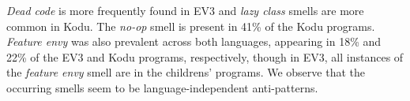 \documentclass[conference]{IEEEtran}
\begin{document}
\emph{Dead code} is more frequently found in EV3 and \emph{lazy class} smells are more common in Kodu. The \emph{no-op} smell is present in 41\% of the Kodu programs. \emph{Feature envy} was also prevalent across both languages, appearing in 18\% and 22\% of the EV3 and Kodu programs, respectively, though in EV3, all instances of the \emph{feature envy} smell are in the childrens' programs. 
We observe that the occurring smells seem to be language-independent anti-patterns. 



\end{document}

